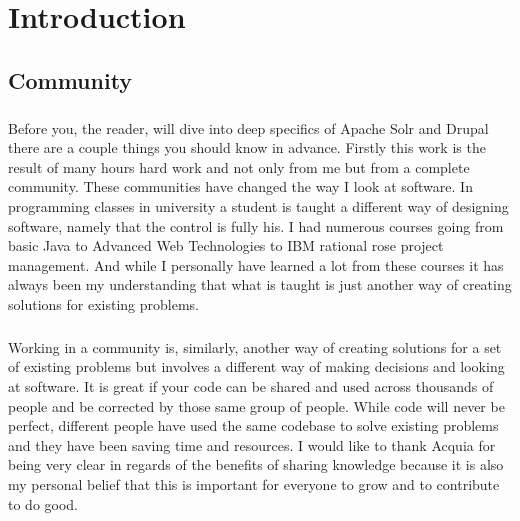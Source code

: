 \chapter{Introduction}

\section{Community}

\paragraph{}
Before you, the reader, will dive into deep specifics of Apache Solr and Drupal there are a couple things you should know in advance. Firstly this work is the result of many hours hard work and not only from me but from a complete community. These communities have changed the way I look at software. In programming classes in university a student is taught a different way of designing software, namely that the control is fully his. I had numerous courses going from basic Java to Advanced Web Technologies to IBM rational rose project management. And while I personally have learned a lot from these courses it has always been my understanding that what is taught is just another way of creating solutions for existing problems. 
\paragraph{}
Working in a community is, similarly, another way of creating solutions for a set of existing problems but involves a different way of making decisions and looking at software. It is great if your code can be shared and used across thousands of people and be corrected by those same group of people. While code will never be perfect, different people have used the same codebase to solve existing problems and they have been saving time and resources. I would like to thank Acquia for being very clear in regards of the benefits of sharing knowledge because it is also my personal belief that this is important for everyone to grow and to contribute to do good.
